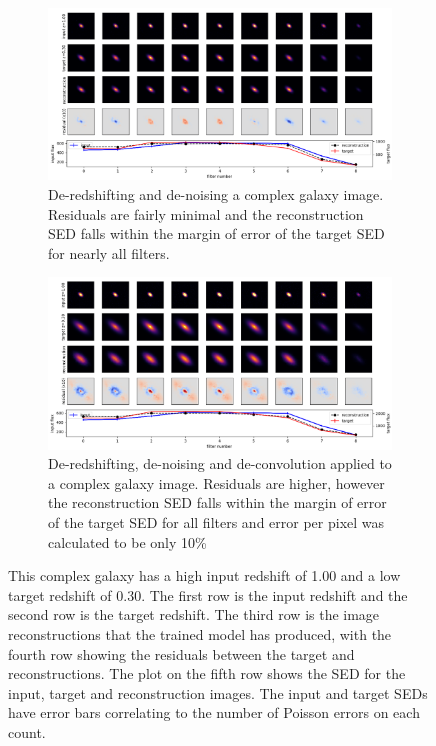 \documentclass[fleqn,usenatbib]{mnras}
\begin{document}
\begin{figure}

    \begin{subfigure}[b]{2\columnwidth}
        \centering
	    \includegraphics[width=\columnwidth]{Figures/bd-noisy-high-noiseless-low.png}
        \caption{De-redshifting and de-noising a complex galaxy image. Residuals are fairly minimal and the reconstruction SED falls within the margin of error of the target SED for nearly all filters.}
        \label{fig:complex-noisy-high-noiseless-low}
    \end{subfigure}
    
    \begin{subfigure}[b]{2\columnwidth}
        \centering
	    \includegraphics[width=\columnwidth]{Figures/bd-noisy-high-standard-low.png}
        \caption{De-redshifting, de-noising and de-convolution applied to a complex galaxy image. Residuals are higher, however the reconstruction SED falls within the margin of error of the target SED for all filters and error per pixel was calculated to be only 10\%}
        \label{fig:complex-noisy-high-standard-low}
    \end{subfigure}
    
    \caption{This complex galaxy has a high input redshift of 1.00 and a low target redshift of 0.30. The first row is the input redshift and the second row is the target redshift. The third row is the image reconstructions that the trained model has produced, with the fourth row showing the residuals between the target and reconstructions. The plot on the fifth row shows the SED for the input, target and reconstruction images. The input and target SEDs have error bars correlating to the number of Poisson errors on each count.}
    \label{fig:complex galaxy results plots de-noise}

\end{figure}
\end{document}
